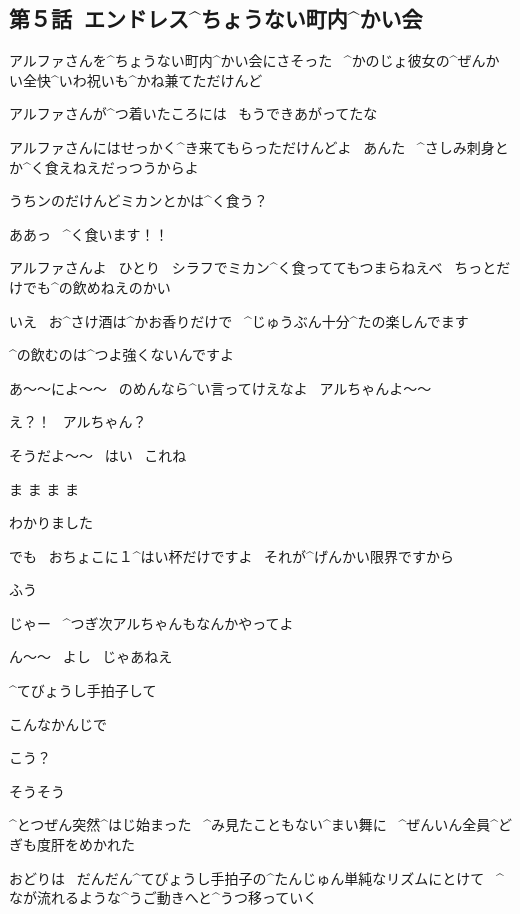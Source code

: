 \subsection{第５話\ エンドレス^{ちょうない}{町内}^{かい}{会}}

\page[102]
\Narrator アルファさんを^{ちょうない}{町内}^{かい}{会}にさそった
\ ^{かのじょ}{彼女}の^{ぜんかい}{全快}^{いわ}{祝}いも^{かね}{兼}てただけんど

\page[103]
\Narrator アルファさんが^{つ}{着}いたころには
\ もうできあがってたな

\Person アルファさんにはせっかく^{き}{来}てもらっただけんどよ
\ あんた
\ ^{さしみ}{刺身}とか^{く}{食}えねえだっつうからよ

\Person うちンのだけんどミカンとかは^{く}{食}う？

\Alpha ああっ
\ ^{く}{食}います！！

\page[104]
\Ojisan アルファさんよ
\ ひとり
\ シラフでミカン^{く}{食}っててもつまらねえべ
\ ちっとだけでも^{の}{飲}めねえのかい

\Alpha いえ
\ お^{さけ}{酒}は^{かお}{香}りだけで
\ ^{じゅうぶん}{十分}^{たの}{楽}しんでます

\Alpha ^{の}{飲}むのは^{つよ}{強}くないんですよ

\page[105]
\Person あ〜〜によ〜〜
\ のめんなら^{い}{言}ってけえなよ
\ アルちゃんよ〜〜

\Alpha え？！
\ アルちゃん？

\Person そうだよ〜〜
\ はい
\ これね

\Person ま ま ま ま

\Alpha わかりました

\Alpha でも
\ おちょこに１^{はい}{杯}だけですよ
\ それが^{げんかい}{限界}ですから

\page[106]
\Alpha ふう

\page[107]
\Person じゃー
\ ^{つぎ}{次}アルちゃんもなんかやってよ

\Alpha ん〜〜
\ よし
\ じゃあねえ

\Alpha ^{てびょうし}{手拍子}して

\Alpha こんなかんじで

\Person こう？

\Alpha そうそう

\page[109]
\Narrator ^{とつぜん}{突然}^{はじ}{始}まった
\ ^{み}{見}たこともない^{まい}{舞}に
\ ^{ぜんいん}{全員}^{どぎも}{度肝}をめかれた

\page[110]
\Narrator おどりは
\ だんだん^{てびょうし}{手拍子}の^{たんじゅん}{単純}なリズムにとけて
\ ^{なが}{流}れるような^{うご}{動}きへと^{うつ}{移}っていく

